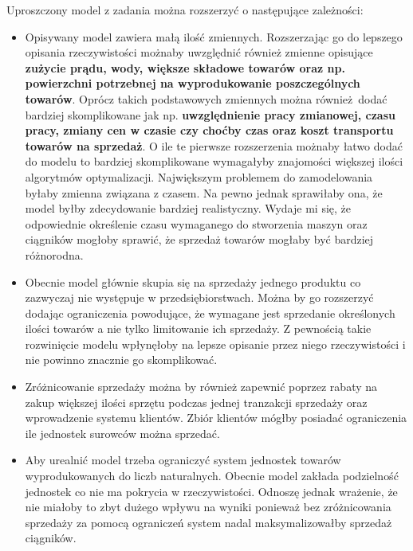 \documentclass{article}
\begin{document}
Uproszczony model z zadania można rozszerzyć o następujące zależności:

\begin{itemize}
  \item Opisywany model zawiera małą ilość zmiennych. Rozszerzając go do lepszego opisania rzeczywistości możnaby uwzględnić również zmienne opisujące \textbf{zużycie prądu, wody, większe składowe towarów oraz np. powierzchni potrzebnej na wyprodukowanie poszczególnych towarów}. 
    Oprócz takich podstawowych zmiennych można również dodać bardziej skomplikowane jak np. \textbf{uwzględnienie pracy zmianowej, czasu pracy, zmiany cen w czasie czy choćby czas oraz koszt transportu towarów na sprzedaż}. O ile te pierwsze rozszerzenia możnaby łatwo dodać
    do modelu to bardziej skomplikowane wymagałyby znajomości większej ilości algorytmów optymalizacji. Największym problemem do zamodelowania byłaby zmienna związana z czasem. Na pewno jednak sprawiłaby ona, że model byłby zdecydowanie bardziej realistyczny. Wydaje mi się, że
    odpowiednie określenie czasu wymaganego do stworzenia maszyn oraz ciągników mogłoby sprawić, że sprzedaż towarów mogłaby być bardziej różnorodna.
  \item Obecnie model głównie skupia się na sprzedaży jednego produktu co zazwyczaj nie występuje w przedsiębiorstwach. Można by go rozszerzyć dodając ograniczenia powodujące, że wymagane jest sprzedanie określonych ilości towarów a nie tylko limitowanie ich sprzedaży. 
    Z pewnością takie rozwinięcie modelu wpłynęłoby na lepsze opisanie przez niego rzeczywistości i nie powinno znacznie go skomplikować.
  \item Zróżnicowanie sprzedaży można by również zapewnić poprzez rabaty na zakup większej ilości sprzętu podczas jednej tranzakcji sprzedaży oraz wprowadzenie systemu klientów. Zbiór klientów mógłby posiadać ograniczenia ile jednostek surowców można sprzedać.
  \item Aby urealnić model trzeba ograniczyć system jednostek towarów wyprodukowanych do liczb naturalnych. Obecnie model zakłada podzielność jednostek co nie ma pokrycia w rzeczywistości. Odnoszę jednak wrażenie, że nie miałoby to zbyt dużego wpływu na wyniki ponieważ
    bez zróżnicowania sprzedaży za pomocą ograniczeń system nadal maksymalizowałby sprzedaż ciągników.
\end{itemize}
\end{document}
